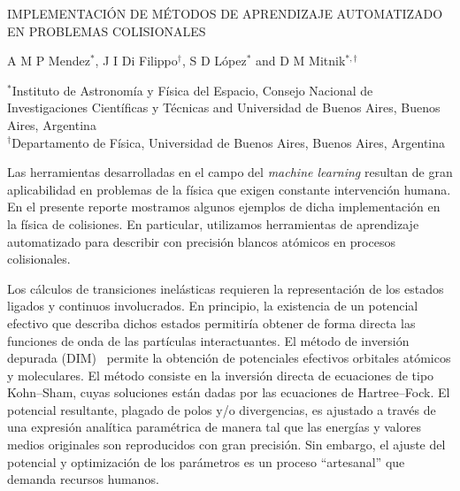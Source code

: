 \documentclass[11pt]{article}
\newcommand{\abstracttitle}[1]{\begin{center}#1\end{center}}
\newcommand{\authors}[1]{\vspace*{-0.3cm}\begin{center}#1\end{center}\vspace*{-0.3cm}}
\newcommand{\addresses}[1]{\begin{center}#1\end{center}}
\newcommand{\abstracttext}[1]{\vspace{0.5cm}\columnsep0.75cm \begin{multicols}{2} #1 \end{multicols}}
\begin{document}
\abstracttitle{IMPLEMENTACIÓN DE MÉTODOS DE APRENDIZAJE AUTOMATIZADO
\\ EN PROBLEMAS COLISIONALES}

\authors{
A M P Mendez$^\ast$,
J I Di Filippo$^\dag$,
S D López$^\ast$
and D M Mitnik$^{\ast,\dag}$ 
}



\addresses{
$^\ast$Instituto de Astronom\'ia y F\'isica del Espacio, Consejo 
Nacional de Investigaciones Cient\'ificas y T\'ecnicas and 
Universidad de Buenos Aires, Buenos Aires, Argentina \\
$^\dag$Departamento de F\'isica, Universidad de Buenos Aires, 
Buenos Aires, Argentina
}


\abstracttext{
Las herramientas desarrolladas en el campo del {\it machine
learning} resultan de gran aplicabilidad en problemas de 
la física que exigen constante intervención humana. 
En el presente reporte mostramos algunos ejemplos de 
dicha implementación en la física de colisiones. 
En particular, utilizamos herramientas de aprendizaje automatizado 
para describir con precisión blancos atómicos en procesos
colisionales.

Los cálculos de transiciones inelásticas requieren la 
representación de los estados ligados y continuos involucrados. 
En principio, la existencia de un potencial efectivo 
que describa dichos estados permitiría obtener de forma directa 
las funciones de onda de las partículas interactuantes.
El método de inversión depurada (DIM)~\cite{Mendez:16} permite
la obtención de potenciales efectivos orbitales atómicos y
moleculares. El método consiste en la inversión directa de 
ecuaciones de tipo Kohn--Sham, cuyas soluciones están dadas 
por las ecuaciones de Hartree--Fock. El potencial resultante,
plagado de polos y/o divergencias, es ajustado a través de una
expresión analítica paramétrica de manera tal que las energías
y valores medios originales son reproducidos con gran precisión. 
Sin embargo, el ajuste del potencial y optimización de los
parámetros es un proceso ``artesanal'' que demanda recursos 
humanos. 

}
\end{document}
